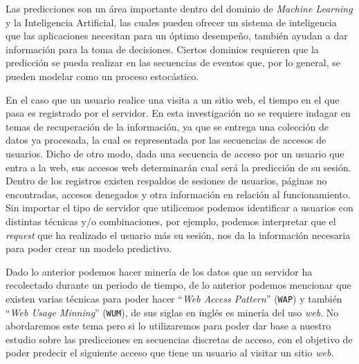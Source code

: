 Las predicciones son un área importante dentro del dominio de \emph{Machine Learning} y la Inteligencia Artificial, las cuales pueden ofrecer un sistema de inteligencia que las aplicaciones necesitan para un óptimo desempeño, también ayudan a dar información para la toma de decisiones. Ciertos dominios requieren que la predicción se pueda realizar en las secuencias de eventos que, por lo general, se pueden modelar como un proceso estocástico. 



En el caso  que un usuario realice una visita a un sitio web, el tiempo en el que pasa es registrado por el servidor. En esta investigación no se requiere indagar en temas de recuperación de la información, ya que se entrega una colección de datos ya procesada, la cual es representada por las secuencias de accesos de usuarios. 
Dicho de otro modo, dada una secuencia de acceso por un usuario que entra a la web, sus accesos web determinarán cual será la predicción de su sesión. Dentro de los registros existen respaldos de sesiones de usuarios, páginas no encontradas, accesos denegados y otra información en relación al funcionamiento. Sin importar el tipo de servidor que utilicemos podemos identificar a usuarios con distintas técnicas y/o combinaciones, por ejemplo, podemos interpretar que el \emph{request} que ha realizado el usuario más su sesión, nos da la información necesaria para poder crear un modelo predictivo. 

Dado lo anterior podemos hacer minería de los datos que un servidor ha recolectado durante un periodo de tiempo, de lo anterior  podemos mencionar que existen varias técnicas para poder hacer ``\emph{Web Access Pattern}'' (\texttt{WAP}) y también ``\emph{Web Usage Minning}'' (\texttt{WUM}), de sus siglas en inglés es minería del uso \emph{web}. No abordaremos este tema pero si lo utilizaremos para poder dar base a nuestro estudio sobre las predicciones en secuencias discretas de acceso, con el objetivo de poder predecir el siguiente acceso que tiene un usuario al visitar un sitio \emph{web}.


